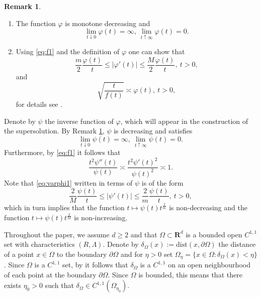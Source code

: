 \documentclass[a4paper,12pt,draft]{article}
\theoremstyle{plain}
\theoremstyle{definition}
\newtheorem{remark}[thm]{Remark}
\numberwithin{equation}{section}
\newcommand\R{\mathbf{R}}
\renewcommand{\leq}{\leqslant}
\renewcommand{\ge}{\geqslant}
\newcommand{\1}{1}
\newcommand{\dist} {\mathrm{dist}}
\begin{document}
\begin{remark}\label{rem:f}
\begin{enumerate}
\item The function $\varphi$ is monotone decreasing and
\[
\lim\limits_{t\downarrow 0}\varphi(t)=\infty,\ \lim\limits_{t\uparrow\infty}\varphi(t)=0.
\]
\item Using \eqref{eq:f1} and the definition of $\varphi$ one can show that
\begin{equation}\label{eq:varphi1}
\frac m 2 \frac{\varphi(t)}{t}\leq |\varphi'(t)|\leq \frac M 2 \frac{\varphi(t)}{t},\ t>0,
\end{equation}
and
\begin{equation}\label{eq:f2}
\sqrt{\frac{t}{f(t)}}\asymp\varphi(t),\ t>0, 
\end{equation}
for details see \cite[Remark 1.1]{abatangelo2}.
\end{enumerate}
\end{remark}
Denote by $\psi$ the inverse function of $\varphi$, which will appear in the construction of the supersolution. By Remark \ref{rem:f}, $\psi$ is decreasing and satisfies
\[
\lim\limits_{t\downarrow 0}\psi(t)=\infty,\ \lim\limits_{t\uparrow\infty}\psi(t)=0.
\]
 Furthermore, by \eqref{eq:f1} it follows that 
\begin{equation}\label{eq:psi1}
	\frac{t^2\psi''(t)}{\psi(t)}\asymp \frac{t^2\psi'(t)^2}{\psi(t)^2}\asymp 1.
\end{equation}
Note that \eqref{eq:varphi1} written in terms of $\psi$ is of the form
\begin{equation}\label{eq:psi2}
\frac 2 M \frac{\psi(t)}{t}\leq |\psi'(t)|\leq \frac 2 m\frac{\psi(t)}{t},\ t>0,
\end{equation}
which in turn implies that the function $t\mapsto \psi(t)t^{\frac 2 m}$ is non-decreasing and the function $t\mapsto \psi(t)t^{\frac 2 M}$ is non-increasing.  



Throughout the paper, we assume $d\ge 2$ and that $\Omega\subset\R^d$ is a bounded open $C^{1,1}$ set with characteristics $(R,\Lambda)$. Denote by $\delta_{\Omega}(x):=\dist(x,\partial\Omega)$ the distance of a point $x\in\Omega$ to the boundary $\partial\Omega$ and for $\eta>0$ set $\Omega_\eta=\{x\in\Omega:\delta_{\Omega}(x)< \eta\}$. Since $\Omega$ is a $C^{1,1}$ set, by \cite[Theorem 5.4.3(i)]{DZ} it follows that $\delta_\Omega$ is a $C^{1,1}$ on an open neighbourhood of each point at the boundary $\partial\Omega$. Since $\Omega$ is bounded, this means that there exists $\eta_0>0$ such that $\delta_\Omega\in C^{1,1}(\Omega_{\eta_0})$. 
\end{document}
